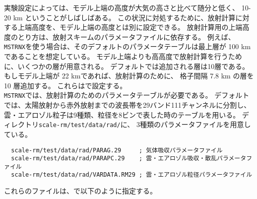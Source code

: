 実験設定によっては、モデル上端の高度が大気の高さと比べて随分と低く、
10-20 km ということがしばしばある。
この状況に対処するために、放射計算に対する上端高度を、モデル上端の高度とは別に設定できる。
放射計算用の上端高度のとり方は、放射スキームのパラメータファイルに依存する。
例えば、\verb|MSTRNX|を使う場合は、そのデフォルトのパラメータテーブルは最上層が 100 km であることを想定している。
モデル上端よりも高高度で放射計算を行うために、いくつかの層が用意される。
デフォルトでは追加される層は10層である。もしモデル上端が 22 kmであれば、放射計算のために、
格子間隔 7.8 km の層を 10 層追加する。
これらはで設定する。\\

\verb|MSTRNX|では、放射計算のためのパラメータテーブルが必要である。
デフォルトでは、太陽放射から赤外放射までの波長帯を29バンド111チャンネルに分割し、
雲・エアロゾル粒子は9種類、粒径を8ビンで表した時のテーブルを用いる。
ディレクトリ\verb|scale-rm/test/data/rad/|に、
3種類のパラメータファイルを用意している。
\begin{verbatim}
  scale-rm/test/data/rad/PARAG.29     ; 気体吸収パラメータファイル
  scale-rm/test/data/rad/PARAPC.29    ; 雲・エアロゾル吸収・散乱パラメータファイル
  scale-rm/test/data/rad/VARDATA.RM29 ; 雲・エアロゾル粒径パラメータファイル
\end{verbatim}
これらのファイルは、で以下のように指定する。\\

\\

